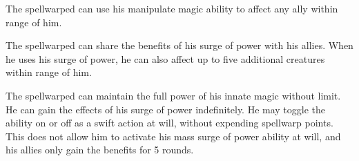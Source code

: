  The spellwarped can use his manipulate magic ability to affect any ally within \rngmed range of him.

 The spellwarped can share the benefits of his surge of power with his allies. When he uses his surge of power, he can also affect up to five additional creatures within \rngmed range of him.

 The spellwarped can maintain the full power of his innate magic without limit. He can gain the effects of his surge of power indefinitely. He may toggle the ability on or off as a swift action at will, without expending spellwarp points. This does not allow him to activate his mass surge of power ability at will, and his allies only gain the benefits for 5 rounds.

\label{Spellwarped Powers}

